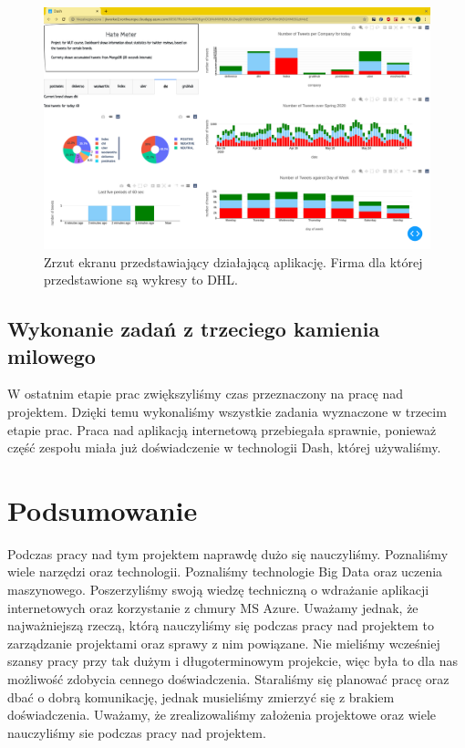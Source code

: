 \documentclass[a4paper,11pt, notitlepage ]{article}
\begin{document}
    \begin{figure}[h]
        \centering
        \includegraphics[width=1 \textwidth]{dhl.png}
        \caption{Zrzut ekranu przedstawiający działającą aplikację. Firma dla której przedstawione są wykresy to DHL.}
        \label{fig:dhl}
    \end{figure}
    
    \subsection{Wykonanie zadań z trzeciego kamienia milowego}
    W ostatnim etapie prac zwiększyliśmy czas przeznaczony na pracę nad projektem. Dzięki temu wykonaliśmy wszystkie zadania wyznaczone w trzecim etapie prac. Praca nad aplikacją internetową przebiegała sprawnie, ponieważ część zespołu miała już doświadczenie w technologii Dash, której używaliśmy.

    \section{Podsumowanie}

    Podczas pracy nad tym projektem naprawdę dużo się nauczyliśmy. Poznaliśmy wiele narzędzi oraz technologii. Poznaliśmy technologie Big Data oraz uczenia maszynowego. Poszerzyliśmy swoją wiedzę techniczną o wdrażanie aplikacji internetowych oraz korzystanie z chmury MS Azure. Uważamy jednak, że najważniejszą rzeczą, którą nauczyliśmy się podczas pracy nad projektem to zarządzanie projektami oraz sprawy z nim powiązane. Nie mieliśmy wcześniej szansy pracy przy tak dużym i długoterminowym projekcie, więc była to dla nas możliwość zdobycia cennego doświadczenia. Staraliśmy się planować pracę oraz dbać o dobrą komunikację, jednak musieliśmy zmierzyć się  z brakiem doświadczenia. Uważamy, że zrealizowaliśmy założenia projektowe oraz wiele nauczyliśmy sie podczas pracy nad projektem.
\end{document}
